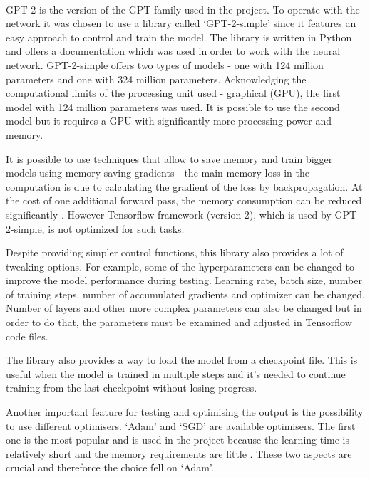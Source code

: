 \documentclass[12pt]{report}
\begin{document}
\paragraph{}
GPT-2 is the version of the GPT family used in the project. To operate with the network it was chosen to use a 
library called `GPT-2-simple' \citep{gpt-2-simple-git} since it features an easy approach to control and train the model.
The library is written in Python and offers a documentation which was used in order to work with the neural network.
GPT-2-simple offers two types of models - one with 124 million parameters and one with 324 million parameters. 
Acknowledging the computational limits of the processing unit used - graphical (GPU), the first model with 124 million
parameters was used. It is possible to use the second model but it requires a GPU with significantly more processing power and
memory. 

It is possible to use techniques that allow to save memory and train bigger models using memory saving gradients -
the main memory loss in the computation is due to calculating the gradient of the loss by backpropagation. At the
cost of one additional forward pass, the memory consumption can be reduced significantly \citep{chen_2016_training}.
However Tensorflow framework (version 2), which is used by GPT-2-simple, is not optimized for such tasks.

Despite providing simpler control functions, this library also provides a lot of tweaking options. For example, 
some of the hyperparameters can be changed to improve the model performance during testing. Learning rate, batch size,
number of training steps, number of accumulated gradients and optimizer can be changed. Number of layers and other
more complex parameters can also be changed but in order to do that, the parameters must be examined and adjusted in Tensorflow
code files.

The library also provides a way to load the model from a checkpoint file. This is useful when the model is trained
in multiple steps and it's needed to continue training from the last checkpoint without losing progress.

Another important feature for testing and optimising the output is the possibility to use different optimisers.
`Adam' and `SGD' are available optimisers. The first one is the most popular and is used in the project because 
the learning time is relatively short and the memory requirements are little \citep{musstafa_2022_optimizers}. 
These two aspects are crucial and thereforce the choice fell on `Adam'.
\end{document}

